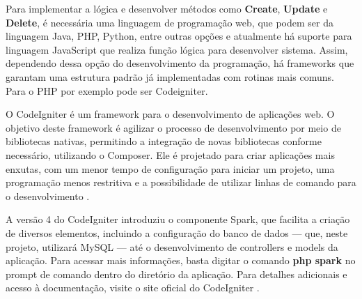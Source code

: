 Para implementar a lógica e desenvolver métodos como \textbf{Create}, \textbf{Update} e \textbf{Delete}, é necessária uma linguagem de programação web, que podem ser da linguagem Java, PHP, Python, entre outras opções e atualmente há suporte para linguagem JavaScript que realiza função lógica para desenvolver sistema. Assim, dependendo dessa opção do desenvolvimento da programação, há frameworks que garantam uma estrutura padrão já implementadas com rotinas mais comuns. Para o PHP por exemplo pode ser Codeigniter.

O CodeIgniter é um framework para o desenvolvimento de aplicações web. O objetivo deste framework é agilizar o processo de desenvolvimento por meio de bibliotecas nativas, permitindo a integração de novas bibliotecas conforme necessário, utilizando o Composer. Ele é projetado para criar aplicações mais enxutas, com um menor tempo de configuração para iniciar um projeto, uma programação menos restritiva e a possibilidade de utilizar linhas de comando para o desenvolvimento \mbox{\cite{b:codeigniter4_2020}.}

A versão 4 do CodeIgniter introduziu o componente Spark, que facilita a criação de diversos elementos, incluindo a configuração do banco de dados — que, neste projeto, utilizará MySQL — até o desenvolvimento de controllers e models da aplicação. Para acessar mais informações, basta digitar o comando \textbf{php spark} no prompt de comando dentro do diretório da aplicação. Para detalhes adicionais e acesso à documentação, visite o site oficial do CodeIgniter \mbox{\cite{m:codeigniter4.5.4}.}